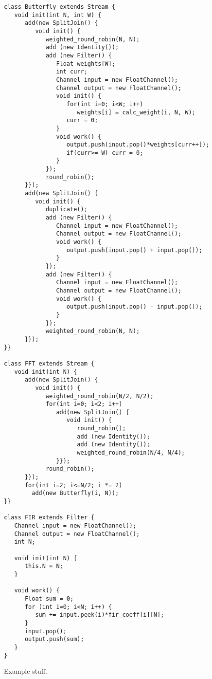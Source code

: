 \begin{figure}[t]
\scriptsize
\begin{verbatim}
class Butterfly extends Stream {
   void init(int N, int W) {
      add(new SplitJoin() {
         void init() {
            weighted_round_robin(N, N);
            add (new Identity());
            add (new Filter() {
               Float weights[W];
               int curr;
               Channel input = new FloatChannel();
               Channel output = new FloatChannel();
               void init() {
                  for(int i=0; i<W; i++)
                     weights[i] = calc_weight(i, N, W);
                  curr = 0;
               }
               void work() {
                  output.push(input.pop()*weights[curr++]);
                  if(curr>= W) curr = 0;
               }    
            });
            round_robin();
      }});
      add(new SplitJoin() {
         void init() {
            duplicate();
            add (new Filter() {   
               Channel input = new FloatChannel();
               Channel output = new FloatChannel();
               void work() {
                  output.push(input.pop() + input.pop());
               }
            });
            add (new Filter() {   
               Channel input = new FloatChannel();
               Channel output = new FloatChannel();
               void work() {
                  output.push(input.pop() - input.pop());
               }
            });
            weighted_round_robin(N, N);
      }});
}}

class FFT extends Stream {
   void init(int N) {
      add(new SplitJoin() {
         void init() {
            weighted_round_robin(N/2, N/2);
            for(int i=0; i<2; i++) 
               add(new SplitJoin() {
                  void init() {
                     round_robin();
                     add (new Identity());
                     add (new Identity());
                     weighted_round_robin(N/4, N/4);
               }});
            round_robin();
      }});
      for(int i=2; i<=N/2; i *= 2)
        add(new Butterfly(i, N));
}}

class FIR extends Filter {
   Channel input = new FloatChannel();
   Channel output = new FloatChannel();           
   int N;

   void init(int N) {
      this.N = N;
   }

   void work() {
      Float sum = 0;
      for (int i=0; i<N; i++) {
         sum += input.peek(i)*fir_coeff[i][N];
      }
      input.pop();
      output.push(sum);
   }
}
\end{verbatim}
\vspace{-12pt}
\caption{\protect\small Example stuff.
\protect\label{fig1}}
\vspace{-12pt}
\end{figure}

